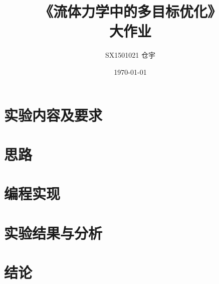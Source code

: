 \documentclass[UTF8]{ctexart}
\title{\heiti 《流体力学中的多目标优化》 \\ 大作业}
\author{SX1501021 仓宇}
\date{\today}
\begin{document}
\maketitle
\setcounter{page}{0}
\thispagestyle{empty}

\clearpage

\tableofcontents

\clearpage

\section{实验内容及要求}

\section{思路}

\section{编程实现}

\section{实验结果与分析}

\section{结论}


\clearpage


\end{document}
